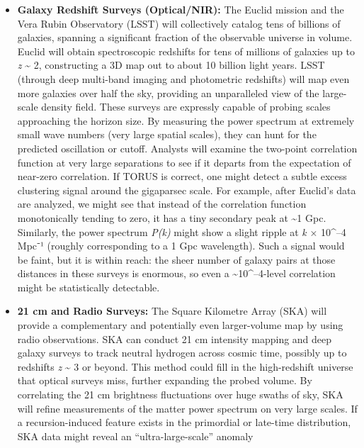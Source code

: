 \documentclass[
]{article}
\begin{document}
\begin{itemize}
\item
  \textbf{Galaxy Redshift Surveys (Optical/NIR):} The Euclid mission and
  the Vera Rubin Observatory (LSST) will collectively catalog tens of
  billions of galaxies, spanning a significant fraction of the
  observable universe in volume. Euclid will obtain spectroscopic
  redshifts for tens of millions of galaxies up to \emph{z}
  \textasciitilde{} 2, constructing a 3D map out to about 10 billion
  light years. LSST (through deep multi-band imaging and photometric
  redshifts) will map even more galaxies over half the sky, providing an
  unparalleled view of the large-scale density field. These surveys are
  expressly capable of probing scales approaching the horizon size. By
  measuring the power spectrum at extremely small wave numbers (very
  large spatial scales), they can hunt for the predicted oscillation or
  cutoff. Analysts will examine the two-point correlation function at
  very large separations to see if it departs from the \LambdaCDM expectation
  of near-zero correlation. If TORUS is correct, one might detect a
  subtle excess clustering signal around the gigaparsec scale. For
  example, after Euclid's data are analyzed, we might see that instead
  of the correlation function monotonically tending to zero, it has a
  tiny secondary peak at \textasciitilde1 Gpc. Similarly, the power
  spectrum \emph{P(k)} might show a slight ripple at \emph{k}  ×
  10\^{}--4 Mpc⁻¹ (roughly corresponding to a 1 Gpc wavelength). Such a
  signal would be faint, but it is within reach: the sheer number of
  galaxy pairs at those distances in these surveys is enormous, so even
  a \textasciitilde10\^{}--4-level correlation might be statistically
  detectable.
\item
  \textbf{21 cm and Radio Surveys:} The Square Kilometre Array (SKA)
  will provide a complementary and potentially even larger-volume map by
  using radio observations. SKA can conduct 21 cm intensity mapping and
  deep galaxy surveys to track neutral hydrogen across cosmic time,
  possibly up to redshifts \emph{z} \textasciitilde{} 3 or beyond. This
  method could fill in the high-redshift universe that optical surveys
  miss, further expanding the probed volume. By correlating the 21 cm
  brightness fluctuations over huge swaths of sky, SKA will refine
  measurements of the matter power spectrum on very large scales. If a
  recursion-induced feature exists in the primordial or late-time
  distribution, SKA data might reveal an ``ultra-large-scale'' anomaly

\end{itemize}
\end{document}
